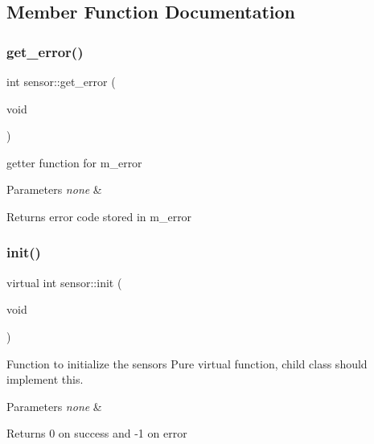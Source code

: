 \subsection{Member Function Documentation}
\mbox{\label{classsensor_ac1312bdb1b0e23c215af87224a54e550}} 
\subsubsection{\texorpdfstring{get\+\_\+error()}{get\_error()}}
{\footnotesize\ttfamily int sensor\+::get\+\_\+error (\begin{DoxyParamCaption}\item[{void}]{ }\end{DoxyParamCaption})\hspace{0.3cm}{\ttfamily [inline]}}



getter function for m\+\_\+error 


\begin{DoxyParams}{Parameters}
{\em none} & \\
\hline
\end{DoxyParams}
\begin{DoxyReturn}{Returns}
error code stored in m\+\_\+error 
\end{DoxyReturn}
\mbox{\label{classsensor_aae55152b437f83053eb018b5ebac874e}} 
\subsubsection{\texorpdfstring{init()}{init()}}
{\footnotesize\ttfamily virtual int sensor\+::init (\begin{DoxyParamCaption}\item[{void}]{ }\end{DoxyParamCaption})\hspace{0.3cm}{\ttfamily [pure virtual]}}



Function to initialize the sensors Pure virtual function, child class should implement this. 


\begin{DoxyParams}{Parameters}
{\em none} & \\
\hline
\end{DoxyParams}
\begin{DoxyReturn}{Returns}
0 on success and -\/1 on error 
\end{DoxyReturn}



